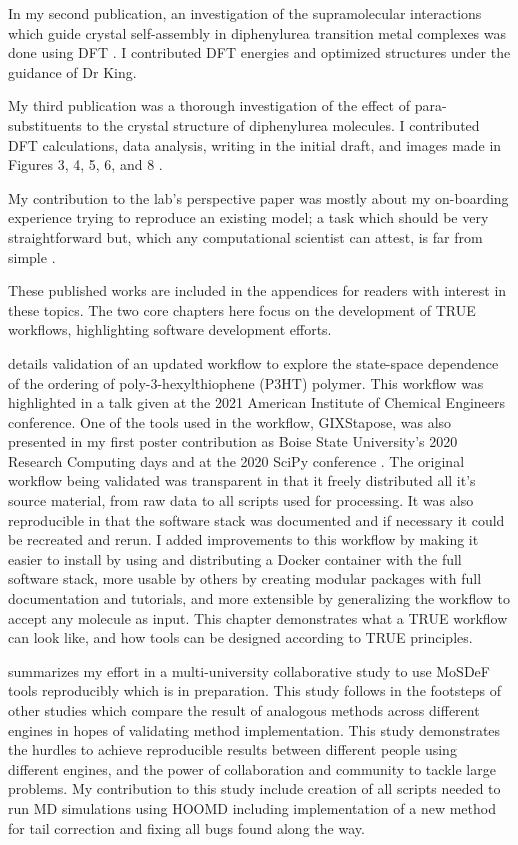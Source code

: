 In my second publication, an investigation of the supramolecular interactions which guide crystal self-assembly in diphenylurea transition metal complexes was done using DFT \cite{Millard2019a}.
I contributed DFT energies and optimized structures under the guidance of Dr King.

My third publication was a thorough investigation of the effect of para-substituents to the crystal structure of diphenylurea molecules. I contributed DFT calculations, data analysis, writing in the initial draft, and images made in Figures 3, 4, 5, 6, and 8 \cite{Fothergill2021}.

My contribution to the lab's perspective paper was mostly about my on-boarding experience trying to reproduce an existing model; a task which should be very straightforward but, which any computational scientist can attest, is far from simple \cite{Jankowski2019}.

These published works are included in the appendices for readers with interest in these topics. The two core chapters here focus on the development of TRUE workflows, highlighting software development efforts.

 details validation of an updated workflow to explore the state-space dependence of the ordering of poly-3-hexylthiophene (P3HT) polymer. 
This workflow was highlighted in a talk given at the 2021 American Institute of Chemical Engineers conference. 
One of the tools used in the workflow, GIXStapose, was also presented in my first poster contribution as Boise State University's 2020 Research Computing days and at the 2020 SciPy conference \cite{gixstapose, scipy2020}. 
The original workflow being validated was transparent in that it freely distributed all it's source material, from raw data to all scripts used for processing.
It was also reproducible in that the software stack was documented and if necessary it could be recreated and rerun.
I added improvements to this workflow by making it easier to install by using and distributing a Docker container with the full software stack, more usable by others by creating modular packages with full documentation and tutorials, and more extensible by generalizing the workflow to accept any molecule as input.
This chapter demonstrates what a TRUE workflow can look like, and how tools can be designed according to TRUE principles.

 summarizes my effort in a multi-university collaborative study to use MoSDeF tools reproducibly which is in preparation. 
This study follows in the footsteps of other studies which compare the result of analogous methods across different engines in hopes of validating method implementation\citep{Shirts2017, Loeffler2018, Schappals2017}. 
This study demonstrates the hurdles to achieve reproducible results between different people using different engines, and the power of collaboration and community to tackle large problems.
My contribution to this study include creation of all scripts needed to run MD simulations using HOOMD including implementation of a new method for tail correction and fixing all bugs found along the way. 

